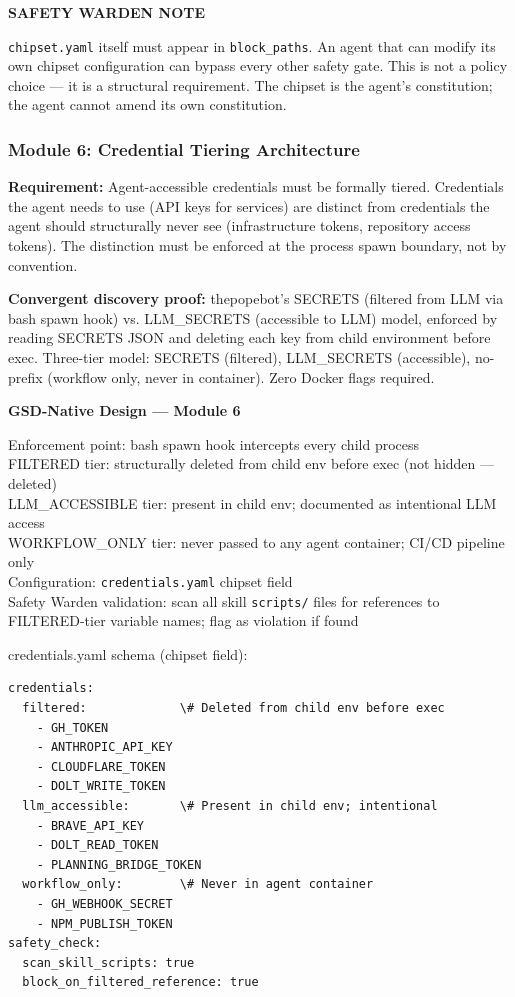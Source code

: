\documentclass[11pt,letterpaper]{article}
\begin{document}
\begin{blockbox}
\textbf{\sffamily SAFETY WARDEN NOTE}

\texttt{chipset.yaml} itself must appear in \texttt{block\_paths}. An agent that can modify its own chipset configuration can bypass every other safety gate. This is not a policy choice --- it is a structural requirement. The chipset is the agent's constitution; the agent cannot amend its own constitution.
\end{blockbox}

\subsubsection{Module 6: Credential Tiering Architecture}

\textbf{Requirement:} Agent-accessible credentials must be formally tiered. Credentials the agent needs to use (API keys for services) are distinct from credentials the agent should structurally never see (infrastructure tokens, repository access tokens). The distinction must be enforced at the process spawn boundary, not by convention.

\textbf{Convergent discovery proof:} thepopebot's SECRETS (filtered from LLM via bash spawn hook) vs. LLM\_SECRETS (accessible to LLM) model, enforced by reading SECRETS JSON and deleting each key from child environment before exec. Three-tier model: SECRETS (filtered), LLM\_SECRETS (accessible), no-prefix (workflow only, never in container). Zero Docker flags required.

\begin{implbox}
\textbf{GSD-Native Design --- Module 6}

Enforcement point: bash spawn hook intercepts every child process\\
FILTERED tier: structurally deleted from child env before exec (not hidden --- deleted)\\
LLM\_ACCESSIBLE tier: present in child env; documented as intentional LLM access\\
WORKFLOW\_ONLY tier: never passed to any agent container; CI/CD pipeline only\\
Configuration: \texttt{credentials.yaml} chipset field\\
Safety Warden validation: scan all skill \texttt{scripts/} files for references to FILTERED-tier variable names; flag as violation if found

credentials.yaml schema (chipset field):
\begin{verbatim}
credentials:
  filtered:             \# Deleted from child env before exec
    - GH_TOKEN
    - ANTHROPIC_API_KEY
    - CLOUDFLARE_TOKEN
    - DOLT_WRITE_TOKEN
  llm_accessible:       \# Present in child env; intentional
    - BRAVE_API_KEY
    - DOLT_READ_TOKEN
    - PLANNING_BRIDGE_TOKEN
  workflow_only:        \# Never in agent container
    - GH_WEBHOOK_SECRET
    - NPM_PUBLISH_TOKEN
safety_check:
  scan_skill_scripts: true
  block_on_filtered_reference: true
\end{verbatim}
\end{implbox}
\end{document}
